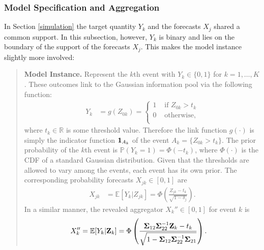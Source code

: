 \documentclass[11pt]{article}
\newcommand{\R}{\mathbb{R}}
\renewcommand{\P}{\mathbb{P}}
\newcommand{\E}{\mathbb{E}}
\theoremstyle{definition}
\theoremstyle{definition}
\def\one{{\bf 1}}
\def\bSigma{{\bf \Sigma}}
\def\Z{{\bf Z}}
\def\P{{\mathbb P}}
\def\E{{\mathbb E}}
\begin{document}
\subsubsection{Model Specification and Aggregation}
In Section \ref{simulation} the target quantity $Y_k$ and the forecasts $X_j$ shared a common support. In this subsection, however, $Y_k$ is binary and lies on the boundary of the support of the forecasts $X_j$. This makes the model instance slightly more involved:

\begin{quote}
\textbf{Model Instance.} Represent the $k$th event with $Y_k \in \{0,1\}$ for $k = 1, \dots, K$. These outcomes link to the Gaussian information pool via the following function:
\begin{align*}
Y_k &= g(Z_{0k}) = \begin{cases}
1 & \text{ if } Z_{0k} > t_k\\
0 & \text{ otherwise},\\
\end{cases}
\end{align*}
where $t_k \in \R$ is some threshold value. Therefore the link function $g(\cdot)$ is simply the indicator function $\one_{A_k}$ of the event $A_k = \{Z_{0k} > t_k\}$. The prior probability of the $k$th event is $\P(Y_k = 1) = \Phi(-t_k)$, where $\Phi(\cdot)$ is the CDF of a standard Gaussian distribution. Given that the thresholds are allowed to vary among the events, each event has its own prior. 
The corresponding probability forecasts $X_{jk} \in [0,1]$ are
\begin{align*}
X_{jk} &= \E[Y_k | Z_{jk}] = \Phi\left( \frac{Z_{jk} - t_k}{\sqrt{1-\delta_j}}\right).
\end{align*}
In a similar manner, 
 the revealed aggregator $X_k'' \in [0,1]$ for event $k$ is
\begin{align}
X_{k}'' &= \E[Y_k | \Z_k] = \Phi\left( \frac{\bSigma_{12}\bSigma_{22}^{-1}\Z_k - t_k}{\sqrt{1-\bSigma_{12}\bSigma_{22}^{-1}\bSigma_{21}}}\right). \label{RevAgg}
\end{align}
\end{quote}
\end{document}
